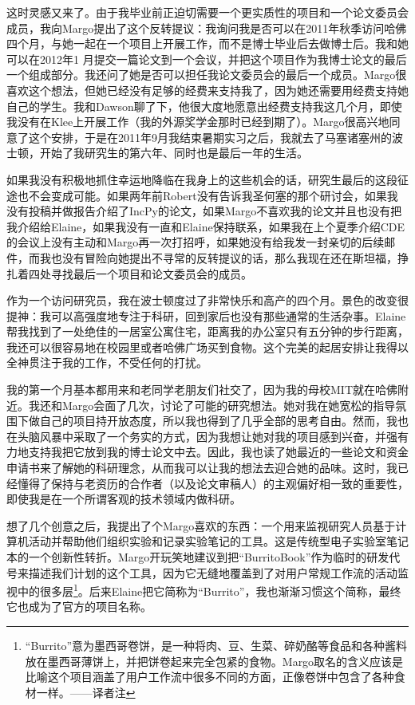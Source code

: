 \documentclass[letter,12pt]{book}
\begin{document}
\begin{CJK}{UTF8}{gbsn}
这时灵感又来了。由于我毕业前正迫切需要一个更实质性的项目和一个论文委员会成员，我向Margo提出了这个反转提议：我询问我是否可以在2011年秋季访问哈佛四个月，与她一起在一个项目上开展工作，而不是博士毕业后去做博士后。我和她可以在2012年1 月提交一篇论文到一个会议，并把这个项目作为我博士论文的最后一个组成部分。我还问了她是否可以担任我论文委员会的最后一个成员。Margo很喜欢这个想法，但她已经没有足够的经费来支持我了，因为她还需要用经费支持她自己的学生。我和Dawson聊了下，他很大度地愿意出经费支持我这几个月，即使我没有在Klee上开展工作（我的外源奖学金那时已经到期了）。Margo很高兴地同意了这个安排，于是在2011年9月我结束暑期实习之后，我就去了马塞诸塞州的波士顿，开始了我研究生的第六年、同时也是最后一年的生活。

如果我没有积极地抓住幸运地降临在我身上的这些机会的话，研究生最后的这段征途也不会变成可能。如果两年前Robert没有告诉我圣何塞的那个研讨会，如果我没有投稿并做报告介绍了IncPy的论文，如果Margo不喜欢我的论文并且也没有把我介绍给Elaine，如果我没有一直和Elaine保持联系，如果我在上个夏季介绍CDE的会议上没有主动和Margo再一次打招呼，如果她没有给我发一封亲切的后续邮件，而我也没有冒险向她提出不寻常的反转提议的话，那么我现在还在斯坦福，挣扎着四处寻找最后一个项目和论文委员会的成员。

\breakline

作为一个访问研究员，我在波士顿度过了非常快乐和高产的四个月。景色的改变很提神：我可以高强度地专注于科研，回到家后也没有那些通常的生活杂事。Elaine帮我找到了一处绝佳的一居室公寓住宅，距离我的办公室只有五分钟的步行距离，我还可以很容易地在校园里或者哈佛广场买到食物。这个完美的起居安排让我得以全神贯注于我的工作，不受任何的打扰。

我的第一个月基本都用来和老同学老朋友们社交了，因为我的母校MIT就在哈佛附近。我还和Margo会面了几次，讨论了可能的研究想法。她对我在她宽松的指导氛围下做自己的项目持开放态度，所以我也得到了几乎全部的思考自由。然而，我也在头脑风暴中采取了一个务实的方式，因为我想让她对我的项目感到兴奋，并强有力地支持我把它放到我的博士论文中去。因此，我也读了她最近的一些论文和资金申请书来了解她的科研理念，从而我可以让我的想法去迎合她的品味。这时，我已经懂得了保持与老资历的合作者（以及论文审稿人）的主观偏好相一致的重要性，即使我是在一个所谓客观的技术领域内做科研。

想了几个创意之后，我提出了个Margo喜欢的东西：一个用来监视研究人员基于计算机活动并帮助他们组织实验和记录实验笔记的工具。这是传统型电子实验室笔记本的一个创新性转折。Margo开玩笑地建议到把“BurritoBook”作为临时的研发代号来描述我们计划的这个工具，因为它无缝地覆盖到了对用户常规工作流的活动监视中的很多层\footnote{``Burrito''意为墨西哥卷饼，是一种将肉、豆、生菜、碎奶酪等食品和各种酱料放在墨西哥薄饼上，并把饼卷起来完全包紧的食物。Margo取名的含义应该是比喻这个项目涵盖了用户工作流中很多不同的方面，正像卷饼中包含了各种食材一样。——译者注}。后来Elaine把它简称为“Burrito”，我也渐渐习惯这个简称，最终它也成为了官方的项目名称。


\end{CJK}
\end{document}
